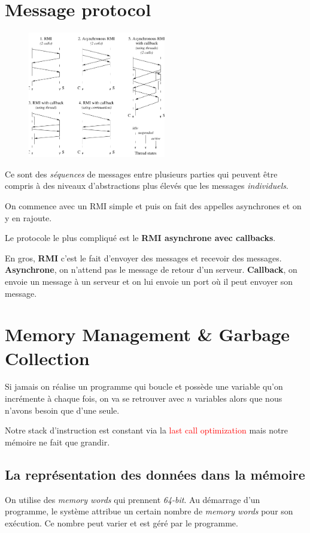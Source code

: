 \documentclass{report}
\begin{document}
\section{Message protocol}
\begin{figure}
\centering
\includegraphics[width=6cm]{img/message.png}
\end{figure}
Ce sont des \textit{séquences} de messages entre plusieurs parties qui peuvent être compris à des niveaux d'abstractions plus élevés que les messages \textit{individuels}.\par 
On commence avec un RMI simple et puis on fait des appelles asynchrones et on y en rajoute. \par 
Le protocole le plus compliqué est le \textbf{RMI asynchrone avec callbacks}.\par
En gros, \textbf{RMI} c'est le fait d'envoyer des messages et recevoir des messages. \textbf{Asynchrone}, on n'attend pas le message de retour d'un serveur. \textbf{Callback}, on envoie un message à un serveur et on lui envoie un port où il peut envoyer son message.

\section{Memory Management \& Garbage Collection}

Si jamais on réalise un programme qui boucle et possède une variable qu'on incrémente à chaque fois, on va se retrouver avec $n$ variables alors que nous n'avons besoin que d'une seule.\par 
Notre stack d'instruction est constant via la \textcolor{red}{last call optimization} mais notre mémoire ne fait que grandir.

\subsection{La représentation des données dans la mémoire}
On utilise des \textit{memory words} qui prennent \textit{64-bit}. Au démarrage d'un programme, le système attribue un certain nombre de \textit{memory words} pour son exécution. Ce nombre peut varier et est géré par le programme.
\end{document}
